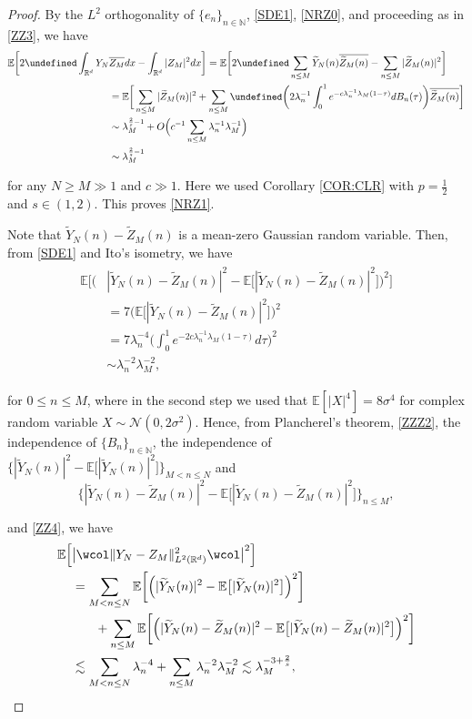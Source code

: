 \documentclass[%
11pt,  reqno]{amsart}
\theoremstyle{remarkstyle}
\newcommand{\1}{\hspace{0.2mm}\text{I}\hspace{0.2mm}}
\newcommand{\noi}{\noindent}
\newcommand{\R}{\mathbb{R}}
\let\Re=\undefined\DeclareMathOperator*{\Re}{Re}
\newcommand{\E}{\mathbb{E}}
\newcommand{\ld}{\lambda}
\newcommand{\s}{\sigma}
\newcommand{\wt}{\widetilde}
\newcommand{\cj}{\overline}
\newcommand{\wick}[1]{\wcol#1\wcol}
\newcommand{\les}{\lesssim}
\newcommand{\N}{\mathbb{N}}
\numberwithin{equation}{section}
\numberwithin{theorem}{section}
\begin{document}
\begin{proof}
		By the $L^2$ orthogonality of $\{e_n\}_{n\in\N}$,  \eqref{SDE1}, \eqref{NRZ0}, and  
		proceeding as in \eqref{ZZ3}, we have
		\begin{align*}
			\E\bigg[  2 \Re \int_{{\R^d}} Y_N & \cj{Z_M} dx - \int_{{\R^d}} |Z_M|^2 dx   \bigg]
			=\E \bigg[ 2 \Re \sum_{n \le M }\wt Y_N(n)  \cj{ \wt Z_M(n)} -\sum_{n \le M }|  \wt Z_M(n) |^2    \bigg]\\
			&=\E \bigg[ \sum_{n \le M } | \wt Z_M(n)  |^2+ \sum_{n \le M } \Re \bigg( 2 \ld_n^{-1}  \int_0^1 e^{- c \ld_n^{-1} \ld_M    (1-\tau) }dB_n(\tau) \bigg)  \cj{\wt Z_M(n)}   \bigg]\\
			&\sim \ld_M^{\frac2s-1} +O\Big( c^{-1} \sum_{n \le M } \ld_n^{-1} \ld_M^{-1}  \Big)\\
			&\sim \ld_M^{\frac2s-1} 
		\end{align*} 
		
		\noi 
		for any $N\ge M\gg 1$ and $c \gg 1$.
		Here we used Corollary \ref{COR:CLR} with $p=\frac12$ and $s\in (1,2)$.
		This proves  \eqref{NRZ1}.
		
		
		
		Note that  $\wt Y_N(n)-\wt Z_M(n)$ is a mean-zero Gaussian random variable.
		Then, from \eqref{SDE1}
		and Ito's isometry, 
		we have 
		\begin{align}
			\begin{split}
				\E \bigg[ \Big( & |\wt Y_N(n)-  \wt Z_M(n)|^2-\E\big[ |\wt Y_N(n)-\wt Z_M(n)|^2 \big] \Big)^2  \bigg]\\
				& = 7
				\Big(\E\big[ |\wt Y_N(n)-\wt Z_M(n)|^2 \big] \Big)^2  \\
				& =7 \ld_n^{-4} \bigg(\int_0^1 e^{-2 c \ld_n^{-1} \ld_M    (1-\tau)  } d\tau \bigg)^2 \\
				&\sim \ld^{-2}_n \ld_M^{-2} ,
			\end{split}
			\label{ZZ4}
		\end{align}
		
		\noi
		for $0 \le n \le M$,
		where in the second step we used {that $\E [|X|^4] = 8 \s^4$ for complex random variable $X \sim \mathcal N (0,2\s^2)$}.
		Hence, 
		from Plancherel's theorem, \eqref{ZZZ2}, 
		the independence of $\{B_n \}_{n \in \N}$, 
		the independence
		of 
		$\big\{ |\wt Y_N(n) |^2- \E \big[ | \wt Y_N(n)|^2 \big]\big\}_{M < n \le N}$
		and 
		\[\big\{ |\wt Y_N(n)-\wt Z_M(n)|^2-\E\big[ |\wt Y_N(n)-\wt Z_M(n)|^2\big]\big\}_{n \le M},\]
		
		\noi 
		and \eqref{ZZ4}, we have
		\begin{align*}
			\E \Big[  & \big|  \wick{\| Y_N-Z_M\|_{L^2({\R^d})}^2}  \big|^2      \Big] \notag \\
			&= \sum_{M< n \le N } \E \bigg[ \Big( |\wt Y_N(n) |^2- \E \big[ | \wt Y_N(n)|^2 \big] \Big)^2 \bigg]\notag \\
			&\hphantom{XX}+ \sum_{n \le M} \E \bigg[ \Big( |\wt Y_N(n)-\wt Z_M(n)|^2-\E\big[ |\wt Y_N(n)-\wt Z_M(n)|^2 \big] \Big)^2  \bigg]\notag  \\
			&\les \sum_{M< n \le N} {\ld_n^{-4}}
			+\sum_{ n \le M }
			\ld_n^{-2} \ld_M^{-2} 
			\les \ld_M^{- 3+ \frac{2}s},
		\end{align*}
		

\end{proof}
\end{document}
